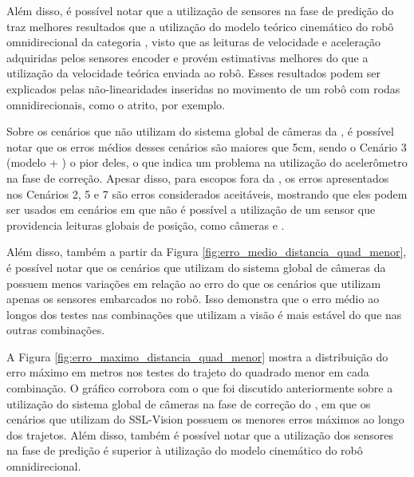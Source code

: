 \documentclass[acronym, symbols, table]{fei}
\begin{document}
	Além disso, é possível notar que a utilização de sensores na fase de predição do  traz melhores resultados que a utilização do modelo teórico cinemático do robô omnidirecional da categoria , visto que as leituras de velocidade e aceleração adquiridas pelos sensores encoder e  provém estimativas melhores do que a utilização da velocidade teórica enviada ao robô. Esses resultados podem ser explicados pelas não-linearidades inseridas no movimento de um robô com rodas omnidirecionais, como o atrito, por exemplo.
	
	Sobre os cenários que não utilizam do sistema global de câmeras da , é possível notar que os erros médios desses cenários são maiores que 5cm, sendo o Cenário 3 (modelo + ) o pior deles, o que indica um problema na utilização do acelerômetro na fase de correção. Apesar disso, para escopos fora da , os erros apresentados nos Cenários 2, 5 e 7 são erros considerados aceitáveis, mostrando que eles podem ser usados em cenários em que não é possível a utilização de um sensor que providencia leituras globais de posição, como câmeras e .

	Além disso, também a partir da Figura \ref{fig:erro_medio_distancia_quad_menor}, é possível notar que os cenários que utilizam do sistema global de câmeras da  possuem menos variações em relação ao erro do que os cenários que utilizam apenas os sensores embarcados no robô. Isso demonstra que o erro médio ao longos dos testes nas combinações que utilizam a visão é mais estável do que nas outras combinações.
	
	A Figura \ref{fig:erro_maximo_distancia_quad_menor} mostra a distribuição do erro máximo em metros nos testes do trajeto do quadrado menor em cada combinação. O gráfico corrobora com o que foi discutido anteriormente sobre a utilização do sistema global de câmeras na fase de correção do , em que os cenários que utilizam do SSL-Vision possuem os menores erros máximos ao longo dos trajetos. Além disso, também é possível notar que a utilização dos sensores na fase de predição é superior à utilização do modelo cinemático do robô omnidirecional.
	
\end{document}
